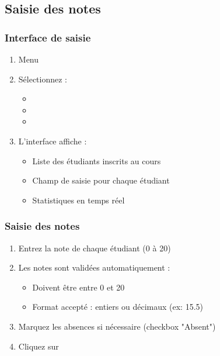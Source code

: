 \subsection{Saisie des notes}

\subsubsection{Interface de saisie}

\begin{enumerate}[leftmargin=*]
    \item Menu 
    \item Sélectionnez :
    \begin{itemize}
        \item {}
        \item {}
        \item {}
    \end{itemize}
    \item L'interface affiche :
    \begin{itemize}
        \item Liste des étudiants inscrits au cours
        \item Champ de saisie pour chaque étudiant
        \item Statistiques en temps réel
    \end{itemize}
\end{enumerate}

\subsubsection{Saisie des notes}

\begin{enumerate}[leftmargin=*]
    \item Entrez la note de chaque étudiant (0 à 20)
    \item Les notes sont validées automatiquement :
    \begin{itemize}
        \item Doivent être entre 0 et 20
        \item Format accepté : entiers ou décimaux (ex: 15.5)
    \end{itemize}
    \item Marquez les absences si nécessaire (checkbox "Absent")
    \item Cliquez sur 
\end{enumerate}

